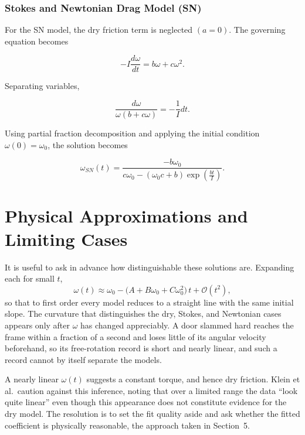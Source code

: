 \documentclass[11pt,letterpaper]{article}
\begin{document}
\subsubsection{Stokes and Newtonian Drag Model (SN)}

For the SN model, the dry friction term is neglected $(a=0)$. The governing equation becomes

\begin{equation}
-I\frac{d\omega}{dt}
=
b\omega+c\omega^2.
\end{equation}

Separating variables,

\begin{equation}
\frac{d\omega}
{\omega(b+c\omega)}
=
-\frac{1}{I}dt.
\end{equation}

Using partial fraction decomposition and applying the initial condition $\omega(0)=\omega_0$, the solution becomes

\begin{equation}
\boxed{
\omega_{SN}(t)
=
\frac{
-b\omega_0
}
{
c\omega_0
-
(\omega_0 c+b)
\exp\!\left(\frac{bt}{I}\right)
}
}.
\end{equation}

\section{Physical Approximations and Limiting Cases}
It is useful to ask in advance how distinguishable these solutions are. Expanding each for
small $t$,
\begin{equation}
\omega(t)\approx\omega_0-\bigl(A+B\omega_0+C\omega_0^2\bigr)\,t+\mathcal{O}(t^2),
\end{equation}
so that to first order every model reduces to a straight line with the same initial slope.
The curvature that distinguishes the dry, Stokes, and Newtonian cases appears only after
$\omega$ has changed appreciably. A door slammed hard reaches the frame within a fraction of
a second and loses little of its angular velocity beforehand, so its free-rotation record is
short and nearly linear, and such a record cannot by itself separate the models.

\begin{physicsinsight}
A nearly linear $\omega(t)$ suggests a constant torque, and hence dry friction. Klein et
al.\ caution against this inference, noting that over a limited range the data ``look quite
linear'' even though this appearance does not constitute evidence for the dry model. The
resolution is to set the fit quality aside and ask whether the fitted coefficient is
physically reasonable, the approach taken in Section~5.
\end{physicsinsight}
\end{document}

